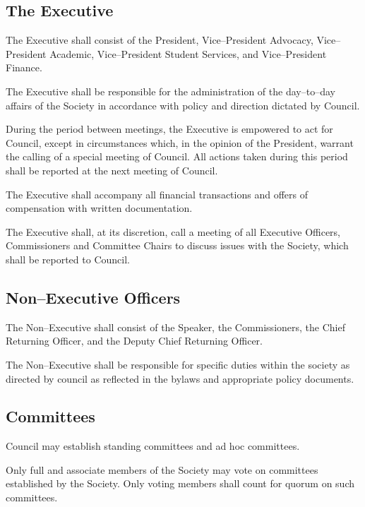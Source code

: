 \subsection{The Executive}
	\begin{longenum}[label*=\thesubsection.\arabic*., align=left]
	\item The Executive shall consist of the President, Vice--President Advocacy, Vice--President Academic, Vice--President Student Services, and Vice--President Finance. 
    \item The Executive shall be responsible for the administration of the day--to--day affairs of the Society in accordance with policy and direction dictated by Council.
    \item During the period between meetings, the Executive is empowered to act for Council, except in circumstances which, in the opinion of the President, warrant the calling of a special meeting of Council. All actions taken during this period shall be reported at the next meeting of Council.
    \item The Executive shall accompany all financial transactions and offers of compensation with written documentation. 
    \item The Executive shall, at its discretion, call a meeting of all Executive Officers, Commissioners and Committee Chairs to discuss issues with the Society, which shall be reported to Council. 

 
\end{longenum}
\subsection{Non--Executive Officers}
	\begin{longenum}[label*=\thesubsection.\arabic*., align=left]
	\item The Non--Executive shall consist of the Speaker, the Commissioners, the Chief Returning Officer, and the Deputy Chief Returning Officer. 
    \item The Non--Executive shall be responsible for specific duties within the society as directed by council as reflected in the bylaws and appropriate policy documents.
\end{longenum}
\subsection{Committees}
	\begin{longenum}[label*=\thesubsection.\arabic*., align=left]
	\item Council may establish standing committees and ad hoc committees.
    \item Only full and associate members of the Society may vote on committees established by the Society. Only voting members shall count for quorum on such committees.
\end{longenum}
